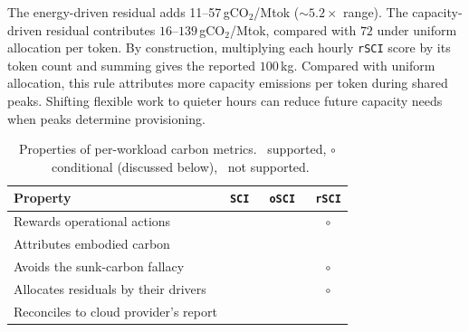 \documentclass[sigconf,screen,nonacm]{acmart}
\newcommand{\SCI}{\texttt{SCI}\xspace}
\newcommand{\RSCI}{\texttt{rSCI}\xspace}
\newcommand{\OSCI}{\texttt{oSCI}\xspace}
\newcommand{\faithful}{\textcolor[HTML]{1a7f37}{\ding{51}}}
\newcommand{\conditional}{\textcolor[HTML]{1a7f37}{\ensuremath{\circ}}}
\newcommand{\notrefl}{\textcolor[HTML]{d1242f}{\ding{55}}}
\begin{document}
The energy-driven residual adds 11--57\,gCO$_2$/Mtok (${\sim}5.2\times$ range).
The capacity-driven residual contributes $16$--$139$\,gCO$_2$/Mtok, compared with $72$ under uniform allocation per token.
By construction, multiplying each hourly \RSCI score by its token count and summing gives the reported $100$\,kg.
Compared with uniform allocation, this rule attributes more capacity emissions per token during shared peaks.
Shifting flexible work to quieter hours can reduce future capacity needs when peaks determine provisioning.

\begin{table}[t]
\centering
\caption{Properties of per-workload carbon metrics. \faithful~supported, \conditional~conditional (discussed below), \notrefl~not supported.}
\vspace{-3mm}
\label{tab:properties}
\small
\setlength{\tabcolsep}{6pt}
\renewcommand{\arraystretch}{1.2}
\begin{tabular}{@{}l ccc@{}}
\toprule
\textbf{Property} & \textbf{\SCI}~\cite{sci-spec} & \textbf{\OSCI}~\cite{bashir2024} & \textbf{\RSCI} \\
\midrule
Rewards operational actions & \faithful & \faithful & \conditional \\
Attributes embodied carbon & \faithful & \notrefl & \faithful \\
Avoids the sunk-carbon fallacy~\cite{bashir2024} & \notrefl & \faithful & \conditional \\
Allocates residuals by their drivers & \notrefl & \notrefl & \conditional \\
Reconciles to cloud provider's report & \notrefl & \notrefl & \faithful \\
\bottomrule
\end{tabular}
\vspace{-2mm}
\end{table}
\end{document}
